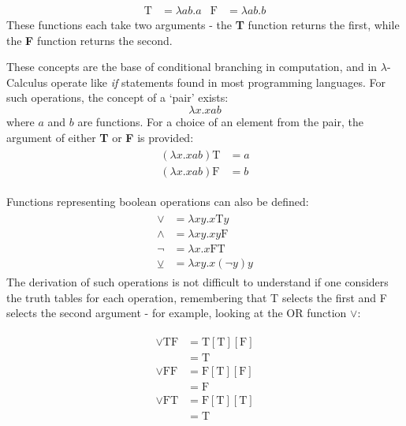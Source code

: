 \documentclass[Master.tex]{subfiles}
\begin{document}
\begin{equation*}
\begin{aligned}
\bm{\mathrm{T}} &= \lambda ab.a
  & %
\bm{\mathrm{F}} &= \lambda ab.b
\end{aligned}
\end{equation*}
These functions each take two arguments - the \textbf{T} function returns the first, while the \textbf{F} function returns the second.

These concepts are the base of conditional branching in computation, and in $\lambda$-Calculus operate like \textit{if} statements found in most programming languages. For such operations, the concept of a `pair' exists:
\cite{church1941lambda}
\begin{equation*}
\lambda x.xab
\end{equation*}
where $a$ and $b$ are functions. For a choice of an element from the pair, the argument of either \textbf{T} or \textbf{F} is provided:
\begin{gather*}
\begin{aligned}
(\lambda x.xab)\bm{\mathrm{T}} &= a\\
(\lambda x.xab)\bm{\mathrm{F}} &= b
\end{aligned}
\end{gather*}

Functions representing boolean operations can also be defined:
\cite{rojas2015lambdatutorial}
\begin{gather*}
\begin{aligned}
\vee &= \lambda xy.x\bm{\mathrm{T}}y\\
\wedge &= \lambda xy.xy\bm{\mathrm{F}}\\
\lnot &= \lambda x.x\bm{\mathrm{FT}} \\
\veebar &= \lambda xy.x(\lnot y)y
\end{aligned}
\end{gather*}
The derivation of such operations is not difficult to understand if one considers the truth tables for each operation, remembering that T selects the first and F selects the second argument - for example, looking at the OR function $\vee$:

\begin{gather*}
\begin{aligned}
\vee \bm{\mathrm{TF}} &= \bm{\mathrm{T}}[\bm{\mathrm{T}}][\bm{\mathrm{F}}] \\
&= \bm{\mathrm{T}} \\
\vee \bm{\mathrm{FF}} &= \bm{\mathrm{F}}[\bm{\mathrm{T}}][\bm{\mathrm{F}}] \\
&= \bm{\mathrm{F}} \\
\vee \bm{\mathrm{FT}} &= \bm{\mathrm{F}}[\bm{\mathrm{T}}][\bm{\mathrm{T}}] \\
&= \bm{\mathrm{T}} \\
\end{aligned}
\end{gather*}
\end{document}
